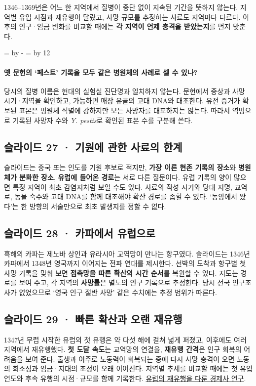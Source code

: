 \documentclass[10pt,a4paper]{article}
\newcommand{\ReserveQuestionSpace}{%
  \par\begingroup
  \dimen0=\pagegoal \advance\dimen0 by -\pagetotal
  \dimen2=\baselineskip \multiply\dimen2 by 12
  \ifdim\dimen0<\dimen2 \newpage\fi
  \endgroup}
\begin{document}
1346–1369년은 어느 한 지역에서 질병이 중단 없이 지속된 기간을 뜻하지 않는다. 지역별 유입 시점과 재유행이 달랐고, 사망 규모를 추정하는 사료도 지역마다 다르다. 이후의 인구·임금 변화를 비교할 때에는 \textbf{각 지역이 언제 충격을 받았는지}를 먼저 맞춘다.\par

\ReserveQuestionSpace
\paragraph{옛 문헌의 ‘페스트’ 기록을 모두 같은 병원체의 사례로 셀 수 있나?}
당시의 질병 이름은 현대의 실험실 진단명과 일치하지 않는다. 문헌에서 증상과 사망 시기·지역을 확인하고, 가능하면 매장 유골의 고대 DNA와 대조한다. 유전 증거가 확보된 표본은 병원체 식별에 강하지만 모든 사망자를 대표하지는 않는다. 따라서 역병으로 기록된 사망자 수와 \emph{Y. pestis}로 확인된 표본 수를 구분해 쓴다.\par

\subsection{슬라이드 27 · 기원에 관한 사료의 한계}
슬라이드는 중국 또는 인도를 기원 후보로 적지만, \textbf{가장 이른 현존 기록의 장소}와 \textbf{병원체가 분화한 장소}, \textbf{유럽에 들어온 경로}는 서로 다른 질문이다. 유럽 기록의 양이 많으면 특정 지역이 최초 감염지처럼 보일 수도 있다. 사료의 작성 시기와 당대 지명, 교역로, 동물 숙주와 고대 DNA를 함께 대조해야 확산 경로를 좁힐 수 있다. ‘동양에서 왔다’는 한 방향의 서술만으로 최초 발생지를 정할 수 없다.\par

\subsection{슬라이드 28 · 카파에서 유럽으로}
흑해의 카파는 제노바 상인과 유라시아 교역망이 만나는 항구였다. 슬라이드는 1346년 카파에서 1348년 영국까지 이어지는 전파 연대를 제시한다. 선박의 도착과 항구별 첫 사망 기록을 맞춰 보면 \textbf{접촉망을 따른 확산의 시간 순서}를 복원할 수 있다. 지도는 경로를 보여 주고, 각 지역의 \textbf{사망률}은 별도의 인구 기록으로 추정한다. 당시 전국 인구조사가 없었으므로 ‘영국 인구 절반 사망’ 같은 수치에는 추정 범위가 따른다.\par

\subsection{슬라이드 29 · 빠른 확산과 오랜 재유행}
1347년 무렵 시작한 유럽의 첫 유행은 약 다섯 해에 걸쳐 넓게 퍼졌고, 이후에도 여러 지역에서 재유행했다. \textbf{첫 도달 속도}는 교역망의 연결을, \textbf{재유행 간격}은 인구 회복의 어려움을 보여 준다. 출생과 이주로 노동력이 회복되는 중에 다시 사망 충격이 오면 노동의 희소성과 임금·지대의 조정이 오래 이어진다. 지역별 추세를 비교할 때에는 첫 유입 연도와 후속 유행의 시점·규모를 함께 기록한다. \href{https://www.cambridge.org/core/books/abs/economy-of-later-renaissance-europe-14601600/recovery-population-and-money-supply/3C0BEA71B27F56F5223D19D31E9BA7FA}{유럽의 재유행을 다룬 경제사 연구}.\par
\end{document}
